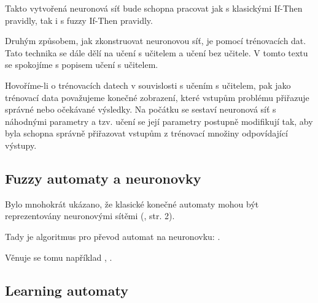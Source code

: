 \documentclass[a4paper,10pt]{article}
\begin{document}
Takto vytvořená neuronová síť bude schopna pracovat jak s klasickými If-Then pravidly, tak i s fuzzy If-Then pravidly. 

Druhým způsobem, jak zkonstruovat neuronovou síť, je pomocí trénovacích dat. Tato technika se dále dělí na učení s učitelem a učení bez učitele. V tomto textu se spokojíme s popisem učení s učitelem.

Hovoříme-li o trénovacích datech v souvislosti s učením s učitelem, pak jako trénovací data považujeme konečné zobrazení, které vstupům problému přiřazuje správné nebo očekávané výsledky. Na počátku se sestaví neuronová síť s náhodnými parametry a tzv. učení se její parametry postupně modifikují tak, aby byla schopna správně přiřazovat vstupům z trénovací množiny odpovídající výstupy.



\subsection{Fuzzy automaty a neuronovky}

Bylo mnohokrát ukázano, že klasické konečné automaty mohou být reprezentovány neuronovými sítěmi (\cite{OmlThoGil-FuzzFinStaAutCanDetEncIntRecNeuNet}, str. 2).

Tady je algoritmus pro převod automat na neuronovku: \cite{OmlThoGil-FuzzFinStaAutCanDetEncIntRecNeuNet}.


Věnuje se tomu například \cite{DarAhmSin-AppFuzzAutTheKnBsNeuNetDevBasLeaMod}, \cite{OmlThoGil-FuzzFinStaAutCanDetEncIntRecNeuNet}.




% 
% 



\subsection{Learning automaty}


\end{document}
